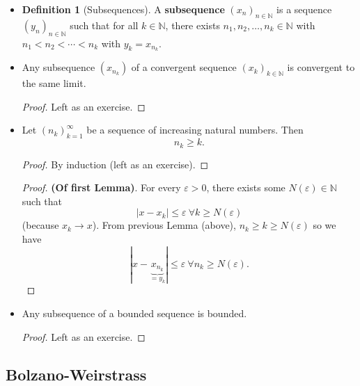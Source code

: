 \documentclass{article}
\newcommand{\N}{\mathbb{N}}
\newcommand{\seq}[2]{(#1_{#2})_{#2 \in \N}}
\newcommand{\?}{\stackrel{?}{=}}
\theoremstyle{definition} %
\newtheorem{definition}[theorem]{Definition} %
\begin{document}
\begin{itemize}
    \item[]
          \begin{definition}[Subsequences]
              A \textbf{subsequence} $\seq{x}{n}$ is a sequence $\seq{y}{n}$ such that for all $k \in \N$, there exists $n_1, n_2, \ldots, n_k \in \N$ with $n_1 < n_2 < \cdots < n_k$ with $y_k = x_{n_k}$.
          \end{definition}
    \item[]
          \begin{lemma}
              Any subsequence $(x_{n_k})$ of a convergent sequence $\seq{x}{k}$ is convergent to the same limit.
          \end{lemma}
          \begin{proof}
              Left as an exercise.
          \end{proof}
    \item[]
          \begin{lemma}
              Let $(n_k)_{k = 1}^{\infty}$ be a sequence of increasing natural numbers. Then
              $$n_k \geq k.$$
          \end{lemma}
          \begin{proof}
              By induction (left as an exercise).
          \end{proof}
          \begin{proof}
              \textbf{(Of first Lemma)}. For every $\varepsilon > 0$, there exists some $N(\varepsilon) \in \N$ such that
              $$|x - x_k| \leq \varepsilon \ \forall k \geq N(\varepsilon)$$
              (because $x_k \rightarrow x$). From previous Lemma (above), $n_k \geq k \geq N(\varepsilon)$ so we have
              $$|x - \underbrace{x_{n_k}}_{ = y_k}| \leq \varepsilon \ \forall n_k \geq N(\varepsilon).$$
          \end{proof}
    \item[]
          \begin{lemma}
              Any subsequence of a bounded sequence is bounded.
          \end{lemma}
          \begin{proof}
              Left as an exercise.
          \end{proof}
\end{itemize}

\subsection{Bolzano-Weirstrass}
\end{document}

